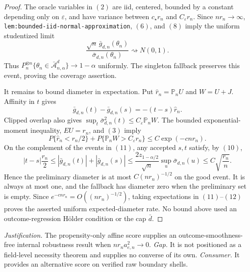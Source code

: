 \documentclass{article}
\begin{document}
\begin{proof}
The oracle variables in \((2)\) are iid, centered, bounded by a constant depending only on \(\varepsilon\), and have variance between \(c_\star r_n\) and \(C_\varepsilon r_n\). Since \(nr_n\to\infty\), \texttt{lem:bounded-iid-normal-approximation}, \((6)\), and \((8)\) imply the uniform studentized limit
\[\frac{\sqrt n\,\bar g_{d,n}(\theta_n)}{\bar\sigma_{d,n}(\theta_n)}\rightsquigarrow N(0,1).\tag{9}\]
Thus \(P_n^{\otimes n}\{\theta_n\in\bar{\mathcal A}_{n,\alpha}^d\}\to1-\alpha\) uniformly. The singleton fallback preserves this event, proving the coverage assertion.

It remains to bound diameter in expectation. Put \(\widehat r_n=\mathbb P_nU\) and \(W=U+J\). Affinity in \(t\) gives
\[\bar g_{d,n}(t)-\bar g_{d,n}(s)=-(t-s)\widehat r_n.\tag{10}\]
Clipped overlap also gives \(\sup_t\bar\sigma_{d,n}^2(t)\le C_\varepsilon\mathbb P_nW\). The bounded exponential-moment inequality, \(EU=r_n\), and \((3)\) imply
\[P\{\widehat r_n<r_n/2\}+P\{\mathbb P_nW>C_\varepsilon r_n\}\le C\exp(-cnr_n).\tag{11}\]
On the complement of the events in \((11)\), any accepted \(s,t\) satisfy, by \((10)\),
\[|t-s|\frac{r_n}{2}\le|\bar g_{d,n}(t)|+|\bar g_{d,n}(s)|\le\frac{2z_{1-\alpha/2}}{\sqrt n}\sup_u\bar\sigma_{d,n}(u)\le C\sqrt{\frac{r_n}{n}}.\tag{12}\]
Hence the preliminary diameter is at most \(C(nr_n)^{-1/2}\) on the good event. It is always at most one, and the fallback has diameter zero when the preliminary set is empty. Since \(e^{-cnr_n}=O((nr_n)^{-1/2})\), taking expectations in \((11)\)--\((12)\) proves the asserted uniform expected-diameter rate. No bound above used an outcome-regression H\"older condition or the cap \(\bar d\).
\end{proof}
\par\smallskip\noindent \textit{Justification.} The propensity-only affine score supplies an outcome-smoothness-free internal robustness result when \(nr_na_{e,n}^2\to0\). \textit{Gap.} It is not positioned as a field-level necessity theorem and supplies no converse of its own. \textit{Consumer.} It provides an alternative score on verified raw boundary shells.
\end{document}
